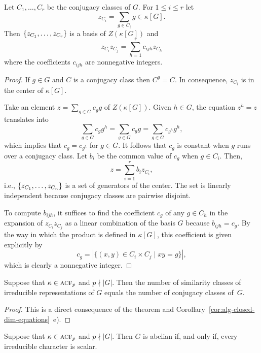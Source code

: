\begin{thm}
    Let\/ $C_1,\dots,C_r$ be the conjugacy classes of\/ $G$. For\/ $1\le i\le r$ let
    $$
        z_{C_i} = \sum_{g\in C_i}g\in\kappa[G].
    $$
    Then\/ $\{z_{C_1},\dots,z_{C_r}\}$ is a basis of\/ $Z(\kappa[G])$ and
    $$
        z_{C_i}z_{C_j} = \sum_{h=1}^rc_{ijh}z_{C_h}
    $$
    where the coefficients\/ $c_{ijh}$ are nonnegative integers.
\end{thm}

\begin{proof}
    If $g\in G$ and $C$ is a conjugacy class then $C^g=C$. In consequence, $z_{C_i}$ is in the center of $\kappa[G]$.

    Take an element $z=\sum_{g\in G}c_gg$ of $Z(\kappa[G])$. Given $h\in G$, the equation $z^h=z$ translates into
    $$
        \sum_{g\in G}c_gg^h=\sum_{g\in G}c_gg
            = \sum_{g\in G}c_{g^h}g^h,
    $$
    which implies that $c_g=c_{g^h}$ for $g\in G$. It follows that $c_g$ is constant when $g$ runs over a conjugacy class. Let $b_i$ be the common value of $c_g$ when $g\in C_i$. Then,
    $$
        z=\sum_{i=1}^rb_iz_{C_i},
    $$
    i.e., $\{z_{C_1},\dots,z_{C_n}\}$ is a set of generators of the center. The set is linearly independent because conjugacy classes are pairwise disjoint.

   To compute $b_{ijh}$, it suffices to find the coefficient $c_g$ of any $g\in C_h$ in the expansion of $z_{C_i}z_{C_j}$ as a linear combination of the basis $G$ because $b_{ijh}=c_g$. By the way in which the product is defined in $\kappa[G]$, this coefficient is given explicitly by
   $$
        c_g = |\{(x, y)\in C_i\times C_j \mid xy=g\}|,
   $$
   which is clearly a nonnegative integer.
\end{proof}

\begin{cor}\label{cor:irr=nb-conjugacy-classes}
     Suppose that\/ $\kappa\in\operatorname{\textnormal{\textsc{acf}}}_p$ and\/ $p\nmid|G|$. Then the number of similarity classes of irreducible representations of\/ $G$ equals the number of conjugacy classes of\/~$G$. 
\end{cor}

\begin{proof}
    This is a direct consequence of the theorem and Corollary~\ref{cor:alg-closed-dim-equations}~e).
\end{proof}

\begin{cor}
    Suppose that\/ $\kappa\in\operatorname{\textnormal{\textsc{acf}}}_p$ and\/ $p\nmid|G|$. Then\/ $G$ is abelian if, and only if, every irreducible character is scalar.
\end{cor}

